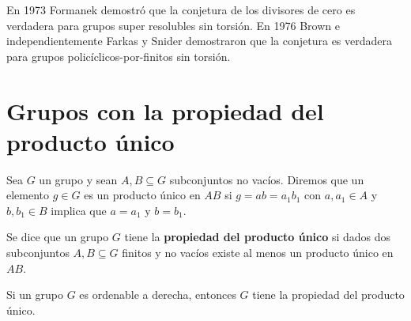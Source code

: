 
En 1973 Formanek demostró que la conjetura de los divisores de cero es
verdadera para grupos super resolubles sin torsión. En 1976 Brown e independientemente
Farkas y Snider demostraron que la conjetura es verdadera para grupos policíclicos-por-finitos sin torsión.

\section{Grupos con la propiedad del producto único}

Sea $G$ un grupo y sean $A,B\subseteq G$ subconjuntos no vacíos. Diremos que un
elemento $g\in G$ es un producto único en $AB$ si $g=ab=a_1b_1$ con $a,a_1\in
A$ y $b,b_1\in B$ implica que $a=a_1$ y $b=b_1$.

\begin{definition}
	Se dice que un grupo $G$ tiene la \textbf{propiedad del producto único} si
	dados dos subconjuntos $A,B\subseteq G$ finitos y no vacíos existe al menos
	un producto único en $AB$.
\end{definition}

\begin{proposition}
	Si un grupo $G$ es ordenable a derecha, entonces $G$ tiene la propiedad del
	producto único.
\end{proposition}


